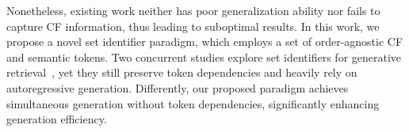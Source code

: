Nonetheless, existing work neither has poor generalization ability nor fails to capture CF information, thus leading to suboptimal results. 
In this work, we propose a novel set identifier paradigm, which employs a set of order-agnostic CF and semantic tokens.  
Two concurrent studies explore set identifiers for generative retrieval~\cite{zeng2024planning,zhang2024generative}, yet they still preserve token dependencies and heavily rely on autoregressive generation. Differently, our proposed paradigm achieves simultaneous generation without token dependencies, significantly enhancing generation efficiency. 

